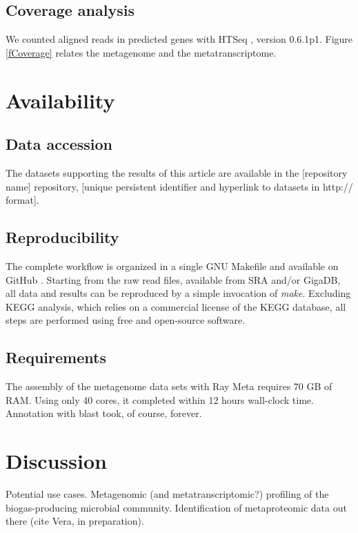 \documentclass{bmcart}
\begin{document}
\subsection*{Coverage analysis}
We counted aligned reads in predicted genes with HTSeq \cite{HTSeq}, version 0.6.1p1.
Figure \ref{fCoverage} relates the metagenome and the metatranscriptome.
%
\section*{Availability}
\subsection*{Data accession}
The datasets supporting the results of this article are available in the [repository name] repository, [unique persistent identifier and hyperlink to datasets in http:// format].
%
\subsection*{Reproducibility}
The complete workflow is organized in a single GNU Makefile and available on GitHub \cite{GitHub}.
Starting from the raw read files, available from SRA and/or GigaDB, all data and results can be reproduced by a simple invocation of \emph{make}.
Excluding KEGG analysis, which relies on a commercial license  of the KEGG database, all steps are performed using free and open-source software.
%
\subsection*{Requirements}
The assembly of the metagenome data sets with Ray Meta requires 70 GB of RAM. Using only 40 cores, it completed within 12 hours wall-clock time.
Annotation with blast took, of course, forever.
%
\section*{Discussion}
Potential use cases.
Metagenomic (and metatranscriptomic?) profiling of the biogas-producing microbial community.
Identification of metaproteomic data out there (cite Vera, in preparation).
\end{document}
